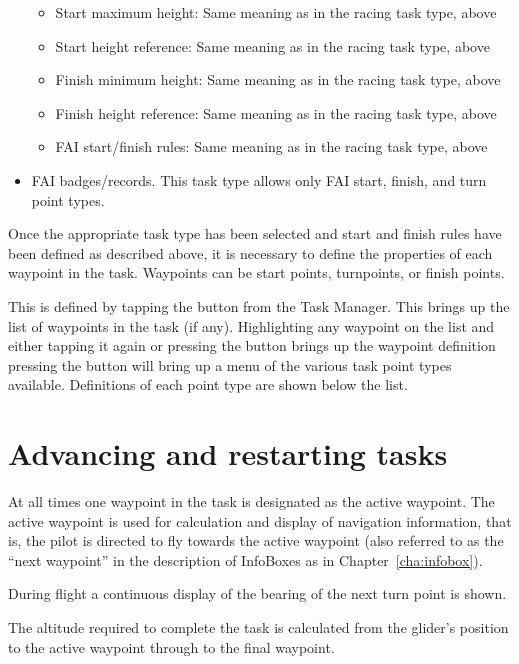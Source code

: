 \begin{itemize}
\begin{itemize}
  \item Start maximum height: Same meaning as in the racing task type, above
  \item Start height reference: Same meaning as in the racing task type, above
  \item Finish minimum height: Same meaning as in the racing task type, above
  \item Finish height reference: Same meaning as in the racing task type, above
   \item FAI start/finish rules: Same meaning as in the racing task type, above
 \end{itemize}
\item FAI badges/records.  This task type allows only FAI start, finish, and turn point types.
\end{itemize}

Once the appropriate task type has been selected and start and finish rules have 
been defined as described above, it is necessary to define the properties of each 
waypoint in the task.  Waypoints can be start points, turnpoints, or finish points.

This is defined by tapping the  button from the Task Manager. 
This brings up the list of waypoints in the task (if any).  Highlighting any waypoint 
on the list and either tapping it again or pressing the  button 
brings up the waypoint definition pressing the  button  will 
bring up a menu of the various task point types available.  Definitions of each 
point type are shown below the list.


\section{Advancing and restarting tasks}\label{sec:advanc-rest-tasks}
At all times one waypoint in the task is designated as the active
waypoint.  The active waypoint is used for calculation and display of
navigation information, that is, the pilot is directed to fly towards
the active waypoint (also referred to as the ``next waypoint'' in the
description of InfoBoxes as in Chapter~\ref{cha:infobox}).

During flight a continuous display of the bearing of the next turn
point is shown.

The altitude required to complete the task is calculated from the
glider's position to the active waypoint through to the final
waypoint.

